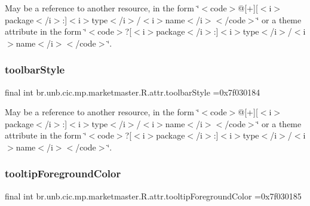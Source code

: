 May be a reference to another resource, in the form \char`\"{}$<$code$>$@\mbox{[}+\mbox{]}\mbox{[}$<$i$>$package$<$/i$>$\+:\mbox{]}$<$i$>$type$<$/i$>$/$<$i$>$name$<$/i$>$$<$/code$>$\char`\"{} or a theme attribute in the form \char`\"{}$<$code$>$?\mbox{[}$<$i$>$package$<$/i$>$\+:\mbox{]}$<$i$>$type$<$/i$>$/$<$i$>$name$<$/i$>$$<$/code$>$\char`\"{}. \mbox{\label{classbr_1_1unb_1_1cic_1_1mp_1_1marketmaster_1_1R_1_1attr_a760ef6639f917a70a1e6b45a1c27f888}} 
\subsubsection{\texorpdfstring{toolbar\+Style}{toolbarStyle}}
{\footnotesize\ttfamily final int br.\+unb.\+cic.\+mp.\+marketmaster.\+R.\+attr.\+toolbar\+Style =0x7f030184\hspace{0.3cm}{\ttfamily [static]}}

May be a reference to another resource, in the form \char`\"{}$<$code$>$@\mbox{[}+\mbox{]}\mbox{[}$<$i$>$package$<$/i$>$\+:\mbox{]}$<$i$>$type$<$/i$>$/$<$i$>$name$<$/i$>$$<$/code$>$\char`\"{} or a theme attribute in the form \char`\"{}$<$code$>$?\mbox{[}$<$i$>$package$<$/i$>$\+:\mbox{]}$<$i$>$type$<$/i$>$/$<$i$>$name$<$/i$>$$<$/code$>$\char`\"{}. \mbox{\label{classbr_1_1unb_1_1cic_1_1mp_1_1marketmaster_1_1R_1_1attr_a8a0527da09571005328d20ef38412567}} 
\subsubsection{\texorpdfstring{tooltip\+Foreground\+Color}{tooltipForegroundColor}}
{\footnotesize\ttfamily final int br.\+unb.\+cic.\+mp.\+marketmaster.\+R.\+attr.\+tooltip\+Foreground\+Color =0x7f030185\hspace{0.3cm}{\ttfamily [static]}}

